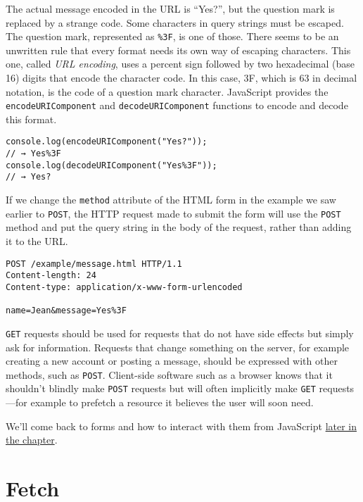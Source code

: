 The actual message encoded in the URL is ``Yes?'', but the question mark is replaced by a strange code. Some characters in query strings must be escaped. The question mark, represented as \lstinline`%3F`, is one of those. There seems to be an unwritten rule that every format needs its own way of escaping characters. This one, called \emph{URL encoding}, uses a percent sign followed by two hexadecimal (base 16) digits that encode the character code. In this case, 3F, which is 63 in decimal notation, is the code of a question mark character. JavaScript provides the \lstinline`encodeURIComponent` and \lstinline`decodeURIComponent` functions to encode and decode this format.

\begin{lstlisting}
console.log(encodeURIComponent("Yes?"));
// → Yes%3F
console.log(decodeURIComponent("Yes%3F"));
// → Yes?
\end{lstlisting}
\noindent{}

If we change the \lstinline`method` attribute of the HTML form in the example we saw earlier to \lstinline`POST`, the HTTP request made to submit the form will use the \lstinline`POST` method and put the query string in the body of the request, rather than adding it to the URL.

\begin{lstlisting}
POST /example/message.html HTTP/1.1
Content-length: 24
Content-type: application/x-www-form-urlencoded

name=Jean&message=Yes%3F
\end{lstlisting}
\noindent

\lstinline`GET` requests should be used for requests that do not have side
effects but simply ask for information. Requests that change something on the server, for example creating a new account or posting a message, should be expressed with other methods, such as \lstinline`POST`. Client-side software such as a browser knows that it shouldn't blindly make \lstinline`POST` requests but will often implicitly make \lstinline`GET` requests—for example to prefetch a resource it believes the user will soon need.

We'll come back to forms and how to interact with them from JavaScript \hyperref[http.forms]{later in the chapter}.

\label{http.fetch}\section{Fetch}

